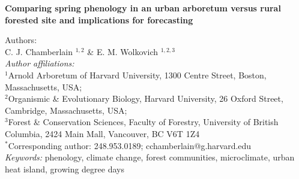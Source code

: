 \documentclass{article}\usepackage[]{graphicx}\usepackage[]{color}
\begin{document}
\noindent\textbf{\Large{Comparing spring phenology in an urban arboretum versus rural forested site and implications for forecasting}}

\noindent Authors:\\
C. J. Chamberlain $^{1,2}$ \& E. M. Wolkovich $^{1,2,3}$
\vspace{2ex}\\
\emph{Author affiliations:}\\
$^{1}$Arnold Arboretum of Harvard University, 1300 Centre Street, Boston, Massachusetts, USA; \\
$^{2}$Organismic \& Evolutionary Biology, Harvard University, 26 Oxford Street, Cambridge, Massachusetts, USA; \\
$^{3}$Forest \& Conservation Sciences, Faculty of Forestry, University of British Columbia, 2424 Main Mall, Vancouver, BC V6T 1Z4\\
\vspace{2ex}
$^*$Corresponding author: 248.953.0189; cchamberlain@g.harvard.edu\\

\noindent \emph{Keywords:} phenology, climate change, forest communities, microclimate, urban heat island, growing degree days\\

\renewcommand{\thetable}{\arabic{table}}
\renewcommand{\thefigure}{\arabic{figure}}
\renewcommand{\labelitemi}{$-$}
\end{document}
